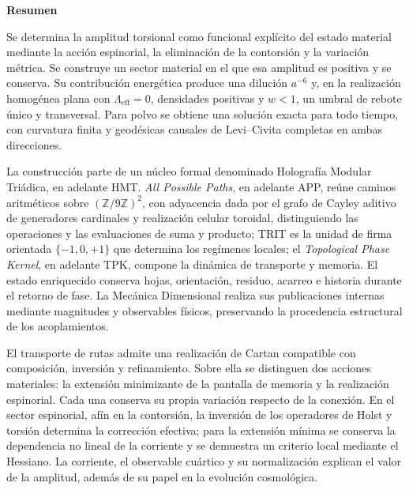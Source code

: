 
\begin{center}\bfseries Resumen\end{center}
\begingroup
\fontsize{10.5}{12.8}\selectfont
\setlength{\parskip}{2pt plus 1pt minus .5pt}
\noindent
Se determina la amplitud torsional como funcional explícito del estado
material mediante la acción espinorial, la eliminación de la contorsión
y la variación métrica. Se construye un sector material en el que esa
amplitud es positiva y se conserva. Su contribución energética produce
una dilución \(a^{-6}\) y, en la realización homogénea plana con
\(\Lambda_{\mathrm{eff}}=0\), densidades positivas y \(w<1\), un umbral
de rebote único y transversal. Para polvo se obtiene una solución exacta
para todo tiempo, con curvatura finita y geodésicas causales de
Levi--Civita completas en ambas direcciones.

La construcción parte de un núcleo formal denominado Holografía Modular
Triádica, en adelante HMT. \emph{All Possible Paths}, en adelante APP,
reúne caminos aritméticos sobre \((\mathbb Z/9\mathbb Z)^2\), con
adyacencia dada por el grafo de Cayley aditivo de generadores cardinales
y realización celular toroidal, distinguiendo las operaciones y las
evaluaciones de suma y producto;
TRIT es la unidad de firma orientada \(\{-1,0,+1\}\) que determina los
regímenes locales; el \emph{Topological Phase Kernel}, en adelante TPK,
compone la dinámica de transporte y memoria. El estado enriquecido
conserva hojas, orientación, residuo, acarreo e historia durante el
retorno de fase. La Mecánica Dimensional realiza sus publicaciones
internas mediante magnitudes y observables físicos, preservando la
procedencia estructural de los acoplamientos.

El transporte de rutas admite una realización de Cartan compatible con
composición, inversión y refinamiento. Sobre ella se distinguen dos
acciones materiales: la extensión minimizante de la pantalla de memoria
y la realización espinorial. Cada una conserva su propia variación
respecto de la conexión. En el sector espinorial, afín en la contorsión,
la inversión de los operadores de Holst y torsión determina la corrección
efectiva; para la extensión mínima se conserva la dependencia no lineal
de la corriente y se demuestra un criterio local mediante el Hessiano.
La corriente, el observable cuártico y su normalización explican el
valor de la amplitud, además de su papel en la evolución cosmológica.

